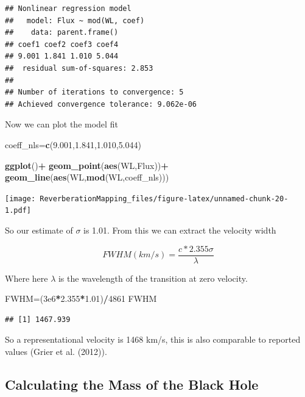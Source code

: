 \documentclass[]{article}
\newenvironment{Shaded}{\begin{snugshade}}{\end{snugshade}}
\newcommand{\DecValTok}[1]{\textcolor[rgb]{0.00,0.00,0.81}{#1}}
\newcommand{\FloatTok}[1]{\textcolor[rgb]{0.00,0.00,0.81}{#1}}
\newcommand{\KeywordTok}[1]{\textcolor[rgb]{0.13,0.29,0.53}{\textbf{#1}}}
\newcommand{\NormalTok}[1]{#1}
\newcommand{\OperatorTok}[1]{\textcolor[rgb]{0.81,0.36,0.00}{\textbf{#1}}}
\newcommand{\StringTok}[1]{\textcolor[rgb]{0.31,0.60,0.02}{#1}}
\begin{document}
\begin{verbatim}
## Nonlinear regression model
##   model: Flux ~ mod(WL, coef)
##    data: parent.frame()
## coef1 coef2 coef3 coef4 
## 9.001 1.841 1.010 5.044 
##  residual sum-of-squares: 2.853
## 
## Number of iterations to convergence: 5 
## Achieved convergence tolerance: 9.062e-06
\end{verbatim}

Now we can plot the model fit

\begin{Shaded}
\begin{Highlighting}[]
\NormalTok{coeff_nls=}\KeywordTok{c}\NormalTok{(}\FloatTok{9.001}\NormalTok{,}\FloatTok{1.841}\NormalTok{,}\FloatTok{1.010}\NormalTok{,}\FloatTok{5.044}\NormalTok{)}

\KeywordTok{ggplot}\NormalTok{()}\OperatorTok{+}
\StringTok{  }\KeywordTok{geom_point}\NormalTok{(}\KeywordTok{aes}\NormalTok{(WL,Flux))}\OperatorTok{+}
\StringTok{  }\KeywordTok{geom_line}\NormalTok{(}\KeywordTok{aes}\NormalTok{(WL,}\KeywordTok{mod}\NormalTok{(WL,coeff_nls)))}
\end{Highlighting}
\end{Shaded}

\texttt{[image: ReverberationMapping\_files/figure-latex/unnamed-chunk-20-1.pdf]}

So our estimate of \(\sigma\) is 1.01. From this we can extract the
velocity width

\[FWHM (km/s)=\frac{c*2.355\sigma}{\lambda}\]

Where here \(\lambda\) is the wavelength of the transition at zero
velocity.

\begin{Shaded}
\begin{Highlighting}[]
\NormalTok{FWHM=(}\FloatTok{3e6}\OperatorTok{*}\FloatTok{2.355}\OperatorTok{*}\FloatTok{1.01}\NormalTok{)}\OperatorTok{/}\DecValTok{4861}
\NormalTok{FWHM}
\end{Highlighting}
\end{Shaded}

\begin{verbatim}
## [1] 1467.939
\end{verbatim}

So a representational velocity is 1468 km/s, this is also comparable to
reported values (Grier et al. (2012)).

\hypertarget{calculating-the-mass-of-the-black-hole}{%
\subsection{Calculating the Mass of the Black
Hole}\label{calculating-the-mass-of-the-black-hole}}
\end{document}
